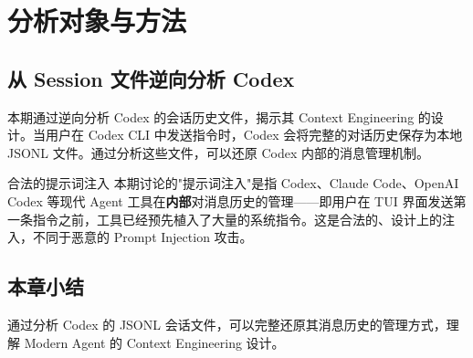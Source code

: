 \section{分析对象与方法}

\subsection{从 Session 文件逆向分析 Codex}

本期通过逆向分析 Codex 的会话历史文件，揭示其 Context Engineering 的设计。当用户在 Codex CLI 中发送指令时，Codex 会将完整的对话历史保存为本地 JSONL 文件。通过分析这些文件，可以还原 Codex 内部的消息管理机制。

\begin{importantbox}{合法的提示词注入}
本期讨论的"提示词注入"是指 Codex、Claude Code、OpenAI Codex 等现代 Agent 工具在\textbf{内部}对消息历史的管理——即用户在 TUI 界面发送第一条指令之前，工具已经预先植入了大量的系统指令。这是合法的、设计上的注入，不同于恶意的 Prompt Injection 攻击。
\end{importantbox}

\subsection{本章小结}

通过分析 Codex 的 JSONL 会话文件，可以完整还原其消息历史的管理方式，理解 Modern Agent 的 Context Engineering 设计。


